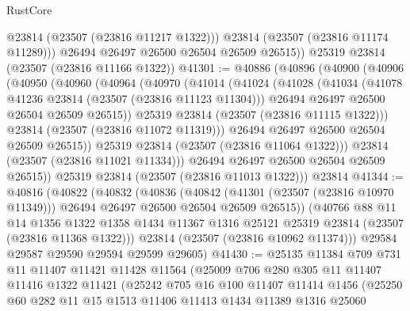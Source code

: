\begin{lexlean}{RustCore}
\begin{coremodule}
            @23814
            (@23507 (@23816 @11217 @1322)))
          @23814
          (@23507 (@23816 @11174 @11289)))
        @26494
        @26497
        @26500
        @26504
        @26509
        @26515))
    @25319
    @23814
    (@23507 (@23816 @11166 @1322))
@41301 := @40886
    (@40896
      (@40900
        (@40906
          (@40950
            (@40960
              (@40964
                (@40970
                  (@41014
                    (@41024
                      (@41028
                        (@41034
                          (@41078 @41236 @23814 (@23507 (@23816 @11123 @11304)))
                          @26494
                          @26497
                          @26500
                          @26504
                          @26509
                          @26515))
                      @25319
                      @23814
                      (@23507 (@23816 @11115 @1322)))
                    @23814
                    (@23507 (@23816 @11072 @11319)))
                  @26494
                  @26497
                  @26500
                  @26504
                  @26509
                  @26515))
              @25319
              @23814
              (@23507 (@23816 @11064 @1322)))
            @23814
            (@23507 (@23816 @11021 @11334)))
          @26494
          @26497
          @26500
          @26504
          @26509
          @26515))
      @25319
      @23814
      (@23507 (@23816 @11013 @1322)))
    @23814
@41344 := @40816
    (@40822
      (@40832
        (@40836
          (@40842
            (@41301 (@23507 (@23816 @10970 @11349)))
            @26494
            @26497
            @26500
            @26504
            @26509
            @26515))
        (@40766
          @88
          @11
          @14
          @1356
          @1322
          @1358
          @1434
          @11367
          @1316
          @25121
          @25319
          @23814
          (@23507 (@23816 @11368 @1322)))
        @23814
        (@23507 (@23816 @10962 @11374)))
      @29584
      @29587
      @29590
      @29594
      @29599
      @29605)
@41430 := @25135
    @11384
    @709
    @731
    @11
    @11407
    @11421
    @11428
    @11564
    (@25009
      @706
      @280
      @305
      @11
      @11407
      @11416
      @1322
      @11421
      (@25242
        @705
        @16
        @100
        @11407
        @11414
        @1456
        (@25250
          @60
          @282
          @11
          @15
          @1513
          @11406
          @11413
          @1434
          @11389
          @1316
          @25060

\end{coremodule}
\end{lexlean}
